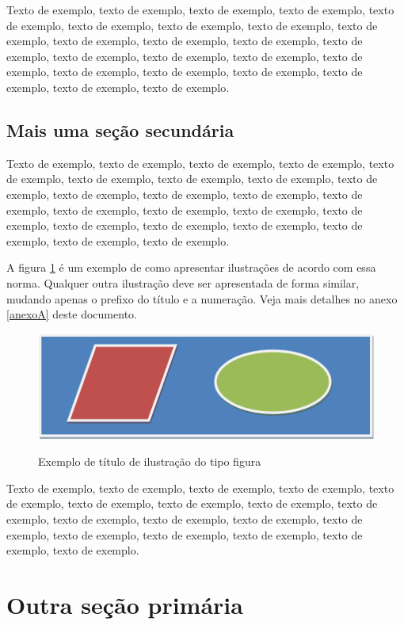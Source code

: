 \documentclass[
	12pt,				%
	oneside,			%
	a4paper,			%
	english,			%
	brazil				%
	]{abntex2ppgsi}
\begin{document}
Texto de exemplo, texto de exemplo, texto de exemplo, texto de exemplo, texto de exemplo, texto de exemplo, texto de exemplo, texto de exemplo, texto de exemplo, texto de exemplo, texto de exemplo, texto de exemplo, texto de exemplo, texto de exemplo, texto de exemplo, texto de exemplo, texto de exemplo, texto de exemplo, texto de exemplo, texto de exemplo, texto de exemplo, texto de exemplo, texto de exemplo.

\section{Mais uma seção secundária}

Texto de exemplo, texto de exemplo, texto de exemplo, texto de exemplo, texto de exemplo, texto de exemplo, texto de exemplo, texto de exemplo, texto de exemplo, texto de exemplo, texto de exemplo, texto de exemplo, texto de exemplo, texto de exemplo, texto de exemplo, texto de exemplo, texto de exemplo, texto de exemplo, texto de exemplo, texto de exemplo, texto de exemplo, texto de exemplo, texto de exemplo.

A figura \ref{fig:figura-exemplo5} é um exemplo de como apresentar ilustrações de acordo com essa norma. Qualquer outra ilustração deve ser apresentada de forma similar, mudando apenas o prefixo do título e a numeração. Veja mais detalhes no anexo \ref{anexoA} deste documento.

\begin{figure}[htbp]
	\centering
	\caption{Exemplo de título de ilustração do tipo figura}
		\includegraphics{figura-exemplo.png}
	\label{fig:figura-exemplo5}
\end{figure}

Texto de exemplo, texto de exemplo, texto de exemplo, texto de exemplo, texto de exemplo, texto de exemplo, texto de exemplo, texto de exemplo, texto de exemplo, texto de exemplo, texto de exemplo, texto de exemplo, texto de exemplo, texto de exemplo, texto de exemplo, texto de exemplo, texto de exemplo, texto de exemplo.

\chapter{Outra seção primária}
\end{document}
